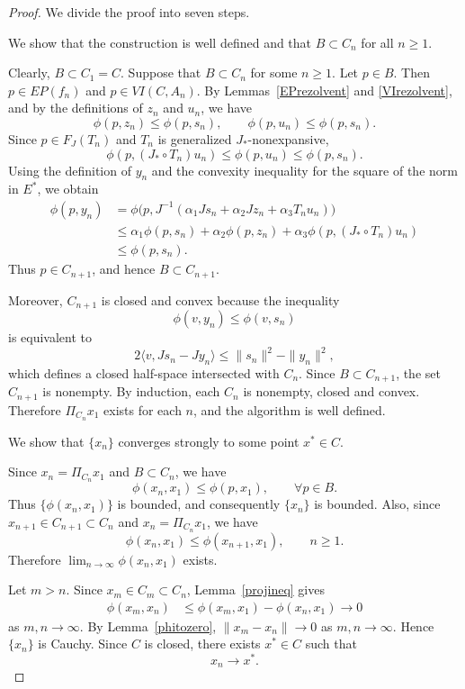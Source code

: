 \documentclass[leqno,12pt]{amsart}
\theoremstyle{definition}
\numberwithin{equation}{section}
\begin{document}
\begin{proof}
We divide the proof into seven steps.

 We show that the construction is well defined and that $B\subset C_n$ for all $n\geq 1$.

Clearly, $B\subset C_1=C$. Suppose that $B\subset C_n$ for some $n\geq 1$. Let $p\in B$. Then $p\in EP(f_n)$ and $p\in VI(C,A_n)$. By Lemmas~\ref{EPrezolvent} and \ref{VIrezolvent}, and by the definitions of $z_n$ and $u_n$, we have
\begin{equation}\label{resolventineq}
\phi(p,z_n)\leq \phi(p,s_n),\qquad \phi(p,u_n)\leq \phi(p,s_n).
\end{equation}
Since $p\in F_J(T_n)$ and $T_n$ is generalized $J_{*}$-nonexpansive,
\begin{equation}\label{Tineq}
\phi(p,(J_{*}\circ T_n)u_n)\leq \phi(p,u_n)\leq \phi(p,s_n).
\end{equation}
Using the definition of $y_n$ and the convexity inequality for the square of the norm in $E^{*}$, we obtain
\begin{align*}
\phi(p,y_n)
&=\phi\big(p,J^{-1}(\alpha_1Js_n+\alpha_2Jz_n+\alpha_3T_nu_n)\big)\\
&\leq \alpha_1\phi(p,s_n)+\alpha_2\phi(p,z_n)+\alpha_3\phi(p,(J_{*}\circ T_n)u_n)\\
&\leq \phi(p,s_n).
\end{align*}
Thus $p\in C_{n+1}$, and hence $B\subset C_{n+1}$.

Moreover, $C_{n+1}$ is closed and convex because the inequality
\[
\phi(v,y_n)\leq \phi(v,s_n)
\]
is equivalent to
\[
2\langle v,Js_n-Jy_n\rangle\leq \|s_n\|^2-\|y_n\|^2,
\]
which defines a closed half-space intersected with $C_n$. Since $B\subset C_{n+1}$, the set $C_{n+1}$ is nonempty. By induction, each $C_n$ is nonempty, closed and convex. Therefore $\Pi_{C_n}x_1$ exists for each $n$, and the algorithm is well defined.

 We show that $\{x_n\}$ converges strongly to some point $x^{*}\in C$.

Since $x_n=\Pi_{C_n}x_1$ and $B\subset C_n$, we have
\[
\phi(x_n,x_1)\leq \phi(p,x_1),\qquad \forall p\in B.
\]
Thus $\{\phi(x_n,x_1)\}$ is bounded, and consequently $\{x_n\}$ is bounded. Also, since $x_{n+1}\in C_{n+1}\subset C_n$ and $x_n=\Pi_{C_n}x_1$, we have
\[
\phi(x_n,x_1)\leq \phi(x_{n+1},x_1),\qquad n\geq 1.
\]
Therefore $\lim_{n\to\infty}\phi(x_n,x_1)$ exists.

Let $m>n$. Since $x_m\in C_m\subset C_n$, Lemma~\ref{projineq} gives
\begin{align}\label{Cauchyineq}
\phi(x_m,x_n)&\leq \phi(x_m,x_1)-\phi(x_n,x_1)\to 0
\end{align}
as $m,n\to\infty$. By Lemma~\ref{phitozero}, $\|x_m-x_n\|\to 0$ as $m,n\to\infty$. Hence $\{x_n\}$ is Cauchy. Since $C$ is closed, there exists $x^{*}\in C$ such that
\begin{equation}\label{xnconv}
x_n\to x^{*}.
\end{equation}


\end{proof}
\end{document}
